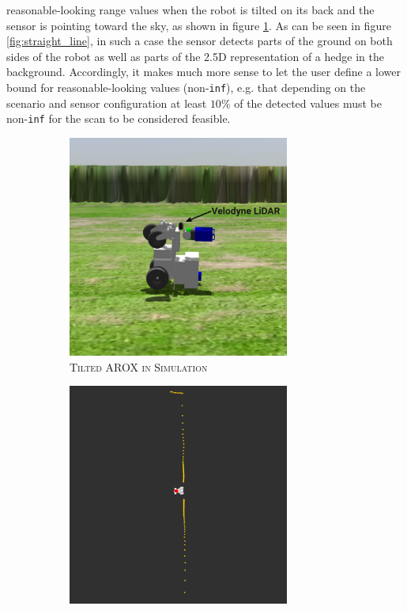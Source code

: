 \documentclass[english, master, utf8]{base/thesis_KBS}
\newcommand{\code}[1]{\colorbox{light-gray}{\texttt{#1}}}
\begin{document}
reasonable-looking range values when the robot is tilted on its back and the sensor is pointing toward the sky, as shown in figure \ref{fig:tilted_AROX}.
As can be seen in figure \ref{fig:straight_line}, in such a case the sensor detects parts of the ground on both sides of the robot as well as parts of the 2.5D 
representation of a hedge in the background. Accordingly, it makes much more sense to let the user define a lower bound for reasonable-looking values (non-\code{inf}),
e.g. that depending on the scenario and sensor configuration at least $10$\% of the detected values must be non-\code{inf} for the scan to be considered feasible.
\begin{figure}[H]
    \centering
    \begin{subfigure}[b]{0.49\textwidth}
        \centering
        \includegraphics[width=0.8\textwidth]{pics/tilted_AROX.png}
        \caption{\textsc{Tilted AROX in Simulation}}
        \label{fig:tilted_AROX}
    \end{subfigure}
    \hfill
    \begin{subfigure}[b]{0.49\textwidth}
        \centering
        \includegraphics[width=0.8\textwidth]{pics/straight_line.png}

\end{subfigure}
\end{figure}
\end{document}
